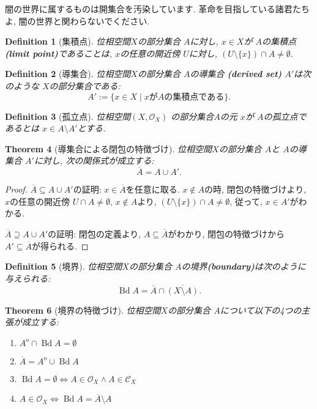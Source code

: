 \documentclass[lualatex]{ltjsbook}
\newcommand{\cl}[1]{\overline{ #1}  }
\newcommand{\Int}[1]{#1 ^{\mathrm{o}} }
\newcommand{\bd}[1]{\operatorname{Bd}{#1}}
\newtheorem{theorem}{Theorem}[section]
\newtheorem{definition}[theorem]{Definition}
\theoremstyle{remark}
\theoremstyle{plain}
\begin{document}
闇の世界に属するものは開集合を汚染しています. 革命を目指している諸君たちよ, 闇の世界と関わらないでください.

\begin{definition}[集積点]
	位相空間$X$の部分集合 $A$に対し,  $x \in X$が $A$の集積点\textbf{(limit point)}であることは,
$x$の任意の開近傍 $U$に対し,  $\left( U\setminus \{x\}  \right) \cap A \neq \emptyset $.
\end{definition}

\begin{definition}[導集合]
	位相空間$X$の部分集合 $A$の導集合 \textbf{(derived set)} $A'$は次のような $X$の部分集合である:
	 \[
	A' := \{x \in X  \mid  x がAの集積点である\} 
	.\] 
\end{definition}

\begin{definition}[孤立点]
	位相空間$\left( X , \mathcal{O}_{X} \right)$ の部分集合$A$の元 $x$が $A$の孤立点であるとは $x \in  A\setminus A'$とする.
\end{definition}

\begin{theorem}[導集合による閉包の特徴づけ]
	位相空間$X$の部分集合 $A$と $A$の導集合 $A'$に対し, 次の関係式が成立する:
	\[
	\cl{A} = A \cup A'
	.\] 
\end{theorem}

\begin{proof}
	$\cl{A} \subseteq A \cup A'$の証明:  $x \in \cl{A}$を任意に取る.  
	$x \not\in  A $の時, 閉包の特徴づけより, $x$の任意の開近傍 $U \cap A \neq \emptyset$, $x \not\in  A$より, $\left( U \setminus \{x\}  \right) \cap A \neq \emptyset $, 従って, $x \in A'$がわかる.

	 $\cl{A} \supseteq A \cup A'$の証明: 閉包の定義より,  $A \subseteq \cl{A}$がわかり, 閉包の特徴づけから $A' \subseteq \cl{A}$が得られる.

\end{proof}

\begin{definition}[境界]
	位相空間$X$の部分集合 $A$の境界\textbf{(boundary)}は次のように与えられる:
	\[
	\bd{A}= \cl{A} \cap \cl{(X\setminus A)}
	.\] 
\end{definition}

\begin{theorem}[境界の特徴づけ]
	位相空間$X$の部分集合 $A$について以下の4つの主張が成立する: 
	 \begin{enumerate}
		\item $\Int{A} \cap \bd{A} = \emptyset$
		\item $\cl{A} = \Int{A} \cup \bd{A}$
		\item  $\bd{A} = \emptyset \iff A \in \mathcal{O}_X \land A \in \mathcal{C}_X$
	\item $A \in \mathcal{O}_X \iff \bd{A} = \cl{A} \setminus A $
	\end{enumerate}
\end{theorem}
\end{document}
